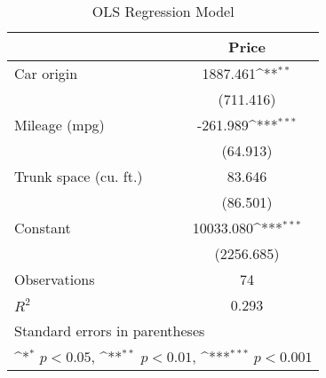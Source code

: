 \begin{table}[htbp]\centering
\def\sym#1{\ifmmode^{#1}\else\(^{#1}\)\fi}
\caption{\centering OLS Regression Model}
\begin{tabular}{l*{1}{c}}
\toprule
                &\multicolumn{1}{c}{Price}\\
\midrule
Car origin      & 1887.461\sym{**} \\
                &(711.416)         \\
\addlinespace
Mileage (mpg)   & -261.989\sym{***}\\
                & (64.913)         \\
\addlinespace
Trunk space (cu. ft.)&   83.646         \\
                & (86.501)         \\
\addlinespace
Constant        &10033.080\sym{***}\\
                &(2256.685)         \\
\midrule
Observations    &       74         \\
\(R^{2}\)       &    0.293         \\
\bottomrule
\multicolumn{2}{l}{\footnotesize Standard errors in parentheses}\\
\multicolumn{2}{l}{\footnotesize \sym{*} \(p<0.05\), \sym{**} \(p<0.01\), \sym{***} \(p<0.001\)}\\
\end{tabular}
\end{table}
